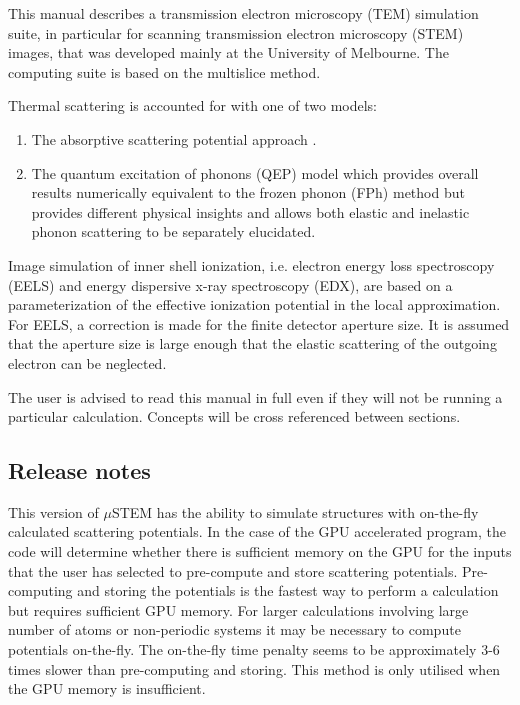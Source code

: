 \documentclass[12pt,a4paper]{article}
\begin{document}
This manual describes a transmission electron microscopy (TEM) simulation suite, in particular for scanning  transmission electron microscopy (STEM) images, that was developed mainly at the University of Melbourne. The computing suite is based on the multislice method.


Thermal scattering is accounted for with one of two models:
%
\begin{enumerate}
\item{The absorptive scattering potential approach \cite{AFOR1,BK1,HH1}}.
\item{The quantum excitation of phonons (QEP) model \cite{Forbes2010} which provides overall results numerically equivalent to the frozen phonon (FPh) method \cite{LXS2} but provides different  physical insights and allows both elastic and inelastic phonon scattering to be separately elucidated}. 
\end{enumerate}
%
Image simulation of inner shell ionization, i.e. electron energy loss spectroscopy (EELS) and energy dispersive x-ray spectroscopy (EDX), are based on a parameterization of the effective ionization potential in the local approximation. For EELS, a correction is made for the finite detector aperture size. It is assumed that the aperture size is large enough that the elastic scattering of the outgoing electron can be neglected. 

The user is advised to read this manual in full even if they will not be running a particular calculation. Concepts will be cross referenced between sections.

\subsection{Release notes}

This version of $\mu$STEM has the ability to simulate structures with on-the-fly calculated scattering potentials.
In the case of the GPU accelerated program, the code will determine whether there is sufficient memory on the GPU for the inputs that the user has selected to pre-compute and store scattering potentials.
Pre-computing and storing the potentials is the fastest way to perform a calculation but requires sufficient GPU memory.
For larger calculations involving large number of atoms or non-periodic systems it may be necessary to compute potentials on-the-fly. The on-the-fly time penalty seems to be approximately 3-6 times slower than pre-computing and storing. 
This method is only utilised when the GPU memory is insufficient.
\end{document}
